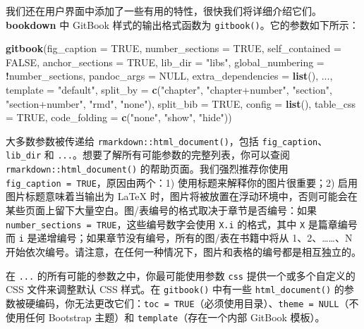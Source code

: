 \documentclass[
  12pt,
]{krantz}
\newenvironment{Shaded}{\begin{snugshade}}{\end{snugshade}}
\newcommand{\AttributeTok}[1]{\textcolor[rgb]{0.13,0.29,0.53}{#1}}
\newcommand{\ConstantTok}[1]{\textcolor[rgb]{0.56,0.35,0.01}{#1}}
\newcommand{\FunctionTok}[1]{\textcolor[rgb]{0.13,0.29,0.53}{\textbf{#1}}}
\newcommand{\NormalTok}[1]{#1}
\newcommand{\SpecialCharTok}[1]{\textcolor[rgb]{0.81,0.36,0.00}{\textbf{#1}}}
\newcommand{\StringTok}[1]{\textcolor[rgb]{0.31,0.60,0.02}{#1}}
\theoremstyle{definition}
\theoremstyle{definition}
\theoremstyle{definition}
\theoremstyle{definition}
\theoremstyle{remark}
\begin{document}
我们还在用户界面中添加了一些有用的特性，很快我们将详细介绍它们。\textbf{bookdown} 中 GitBook 样式的输出格式函数为 \texttt{gitbook()}。它的参数如下所示：

\begin{Shaded}
\begin{Highlighting}[]
\FunctionTok{gitbook}\NormalTok{(}\AttributeTok{fig\_caption =} \ConstantTok{TRUE}\NormalTok{, }\AttributeTok{number\_sections =} \ConstantTok{TRUE}\NormalTok{,}
  \AttributeTok{self\_contained =} \ConstantTok{FALSE}\NormalTok{, }\AttributeTok{anchor\_sections =} \ConstantTok{TRUE}\NormalTok{,}
  \AttributeTok{lib\_dir =} \StringTok{"libs"}\NormalTok{,}
  \AttributeTok{global\_numbering =} \SpecialCharTok{!}\NormalTok{number\_sections,}
  \AttributeTok{pandoc\_args =} \ConstantTok{NULL}\NormalTok{, }\AttributeTok{extra\_dependencies =} \FunctionTok{list}\NormalTok{(), ...,}
  \AttributeTok{template =} \StringTok{"default"}\NormalTok{,}
  \AttributeTok{split\_by =} \FunctionTok{c}\NormalTok{(}\StringTok{"chapter"}\NormalTok{, }\StringTok{"chapter+number"}\NormalTok{, }\StringTok{"section"}\NormalTok{, }\StringTok{"section+number"}\NormalTok{, }\StringTok{"rmd"}\NormalTok{, }\StringTok{"none"}\NormalTok{),}
  \AttributeTok{split\_bib =} \ConstantTok{TRUE}\NormalTok{, }\AttributeTok{config =} \FunctionTok{list}\NormalTok{(), }\AttributeTok{table\_css =} \ConstantTok{TRUE}\NormalTok{,}
  \AttributeTok{code\_folding =} \FunctionTok{c}\NormalTok{(}\StringTok{"none"}\NormalTok{, }\StringTok{"show"}\NormalTok{, }\StringTok{"hide"}\NormalTok{))}
\end{Highlighting}
\end{Shaded}

大多数参数被传递给 \texttt{rmarkdown::html\_document()}，包括 \texttt{fig\_caption}、\texttt{lib\_dir} 和 \texttt{...}。想要了解所有可能参数的完整列表，你可以查阅 \texttt{rmarkdown::html\_document()} 的帮助页面。我们强烈推荐你使用 \texttt{fig\_caption\ =\ TRUE}，原因由两个：1) 使用标题来解释你的图片很重要；2) 启用图片标题意味着当输出为 LaTeX 时，图片将被放置在浮动环境中，否则可能会在某些页面上留下大量空白。图/表编号的格式取决于章节是否编号：如果 \texttt{number\_sections\ =\ TRUE}，这些编号数字会使用 \texttt{X.i} 的格式，其中 \texttt{X} 是篇章编号而 \texttt{i} 是递增编号；如果章节没有编号，所有的图/表在书籍中将从 1、2、\ldots\ldots、N 开始依次编号。请注意，在任何一种情况下，图片和表格的编号都是相互独立的。

在 \texttt{...} 的所有可能的参数之中，你最可能使用参数 \texttt{css} 提供一个或多个自定义的 CSS 文件来调整默认 CSS 样式。在 \texttt{gitbook()} 中有一些 \texttt{html\_document()} 的参数被硬编码，你无法更改它们：\texttt{toc\ =\ TRUE}（必须使用目录）、\texttt{theme\ =\ NULL}（不使用任何 Bootstrap 主题）和 \texttt{template}（存在一个内部 GitBook 模板）。
\end{document}
